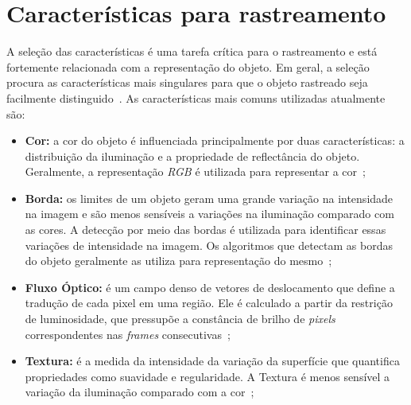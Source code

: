
\section{Características para rastreamento}

	A seleção das características é uma tarefa crítica para o rastreamento e está fortemente relacionada com a representação do objeto. Em geral, a seleção procura as características mais singulares para que o objeto rastreado seja facilmente distinguido~\cite{yilmaz}. As características mais comuns utilizadas atualmente são:

	\begin{itemize}
		\item \textbf{Cor:} a cor do objeto é influenciada principalmente por duas características: a distribuição da iluminação e a propriedade de reflectância do objeto. Geralmente, a representação \textit{RGB} é utilizada para representar a cor~\cite{yilmaz};

		\item \textbf{Borda:} os limites de um objeto geram uma grande variação na intensidade na imagem e são menos sensíveis a variações na iluminação comparado com as cores. A detecção por meio das bordas é utilizada para identificar essas variações de intensidade na imagem. Os algoritmos que detectam as bordas do objeto geralmente as utiliza para representação do mesmo~\cite{yilmaz};

		\item \textbf{Fluxo Óptico:} é um campo denso de vetores de deslocamento que define a tradução de cada pixel em uma região. Ele é calculado a partir da restrição de luminosidade, que pressupõe a constância de brilho de \textit{pixels} correspondentes nas \textit{frames} consecutivas~\cite{yilmaz};

		\item \textbf{Textura:} é a medida da intensidade da variação da superfície que quantifica propriedades como suavidade e regularidade. A Textura é menos sensível a variação da iluminação comparado com a cor~\cite{yilmaz};

	\end{itemize}

